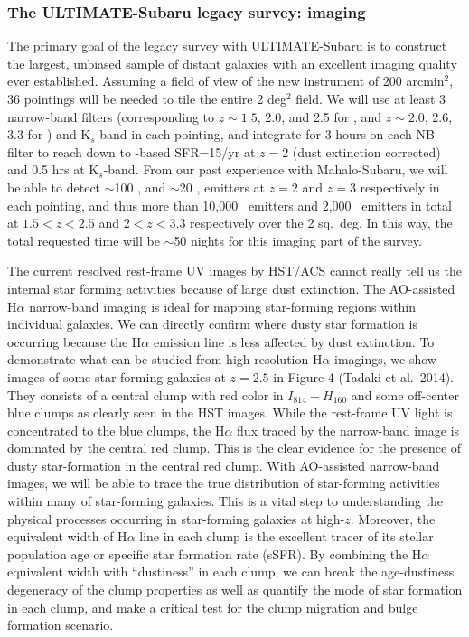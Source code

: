 \subsubsection{The ULTIMATE-Subaru legacy survey: imaging}

The primary goal of the legacy survey with ULTIMATE-Subaru is to construct the
largest, unbiased sample of distant galaxies with an excellent imaging quality
ever established. Assuming a field of view of the new instrument of 200 arcmin$^2$, 
36 pointings will be needed to tile the entire 2 deg$^2$ field.
We will use at least 3 narrow-band filters (corresponding to $z\sim1.5$, 2.0, and 2.5 for \ha,
and $z\sim2.0$, 2.6, 3.3 for \oiii) and K$_s$-band in each pointing,
and integrate for 3 hours on each NB filter to reach down to \ha-based SFR=15\msun/yr 
at $z=2$ (dust extinction corrected) and 0.5 hrs at K$_s$-band.
From our past experience with Mahalo-Subaru, we will be able to detect
$\sim$100 \ha, and $\sim$20 \oiii, emitters at $z=2$ and $z=3$ respectively
in each pointing, and thus more than 10,000 \ha\ emitters and 2,000 \oiii\ emitters
in total at $1.5<z<2.5$ and $2<z<3.3$ respectively over the 2 sq.\ deg.
In this way, the total requested time will be $\sim$50 nights for this 
imaging part of the survey.

The current resolved rest-frame UV images by HST/ACS cannot really tell us 
the internal star forming activities because of large dust extinction. 
The AO-assisted H$\alpha$ narrow-band imaging is ideal for mapping 
star-forming regions within individual galaxies. We can directly confirm 
where dusty star formation is occurring because the H$\alpha$ 
emission line is less affected by dust extinction.
To demonstrate what can be studied from high-resolution H$\alpha$ imagings, 
we show images of some star-forming galaxies at $z=2.5$ in Figure 4 (Tadaki et al.\ 2014).
They consists of a central clump with red color in $I_{814}-H_{160}$
and some off-center blue clumps as clearly seen in the HST images.
While the rest-frame UV light is concentrated to the blue clumps, 
the H$\alpha$ flux traced by the narrow-band image is dominated 
by the central red clump. This is the clear evidence for the presence 
of dusty star-formation in the central red clump.  With AO-assisted 
narrow-band images, we will be able to trace the true distribution of 
star-forming activities within many of star-forming galaxies. This is a 
vital step to understanding the physical processes occurring in star-forming 
galaxies at high-$z$. Moreover, the equivalent width of H$\alpha$ line 
in each clump is the excellent tracer of its stellar population age or
specific star formation rate (sSFR).
By combining the H$\alpha$ equivalent width with ``dustiness'' in each 
clump, we can break the age-dustiness degeneracy of the clump properties 
as well as quantify the mode of star formation in each clump, and make a 
critical test for the clump migration and bulge formation scenario.

